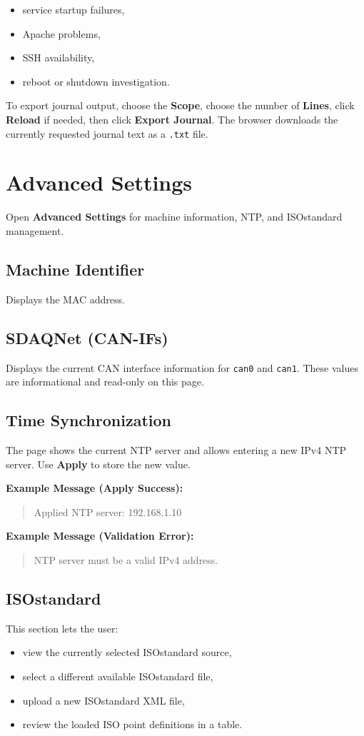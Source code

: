 \documentclass[11pt,a4paper]{article}
\newcommand{\messageexample}[2]{%
\noindent\textbf{Example Message (#1):}\\%
\begin{quote}\raggedright #2\end{quote}%
}
\begin{document}
\begin{itemize}
\item service startup failures,
\item Apache problems,
\item SSH availability,
\item reboot or shutdown investigation.
\end{itemize}

To export journal output, choose the \textbf{Scope}, choose the number of \textbf{Lines}, click \textbf{Reload} if needed, then click \textbf{Export Journal}. The browser downloads the currently requested journal text as a \texttt{.txt} file.

\section{Advanced Settings}
Open \textbf{Advanced Settings} for machine information, NTP, and ISOstandard management.

\subsection{Machine Identifier}
Displays the MAC address.

\subsection{SDAQNet (CAN-IFs)}
Displays the current CAN interface information for \texttt{can0} and \texttt{can1}. These values are informational and read-only on this page.

\subsection{Time Synchronization}
The page shows the current NTP server and allows entering a new IPv4 NTP server. Use \textbf{Apply} to store the new value.

\messageexample{Apply Success}{Applied NTP server: 192.168.1.10}
\messageexample{Validation Error}{NTP server must be a valid IPv4 address.}

\subsection{ISOstandard}
This section lets the user:

\begin{itemize}
\item view the currently selected ISOstandard source,
\item select a different available ISOstandard file,
\item upload a new ISOstandard XML file,
\item review the loaded ISO point definitions in a table.
\end{itemize}
\end{document}
